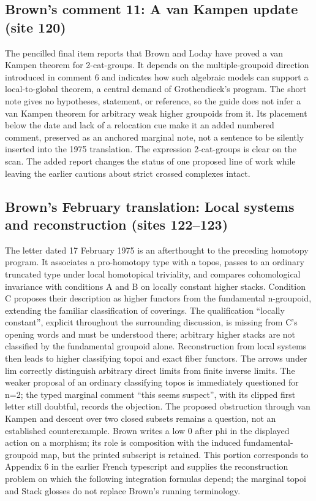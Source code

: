 \subsection*{Brown's comment 11: A van Kampen update (site 120)}
The pencilled final item reports that Brown and Loday have proved a van Kampen theorem for 2-cat-groups. It depends on the multiple-groupoid direction introduced in comment 6 and indicates how such algebraic models can support a local-to-global theorem, a central demand of Grothendieck's program. The short note gives no hypotheses, statement, or reference, so the guide does not infer a van Kampen theorem for arbitrary weak higher groupoids from it. Its placement below the date and lack of a relocation cue make it an added numbered comment, preserved as an anchored marginal note, not a sentence to be silently inserted into the 1975 translation. The expression 2-cat-groups is clear on the scan. The added report changes the status of one proposed line of work while leaving the earlier cautions about strict crossed complexes intact.

\subsection*{Brown's February translation: Local systems and reconstruction (sites 122--123)}
The letter dated 17 February 1975 is an afterthought to the preceding homotopy program. It associates a pro-homotopy type with a topos, passes to an ordinary truncated type under local homotopical triviality, and compares cohomological invariance with conditions A and B on locally constant higher stacks. Condition C proposes their description as higher functors from the fundamental n-groupoid, extending the familiar classification of coverings. The qualification ``locally constant'', explicit throughout the surrounding discussion, is missing from C's opening words and must be understood there; arbitrary higher stacks are not classified by the fundamental groupoid alone. Reconstruction from local systems then leads to higher classifying topoi and exact fiber functors. The arrows under lim correctly distinguish arbitrary direct limits from finite inverse limits. The weaker proposal of an ordinary classifying topos is immediately questioned for n=2; the typed marginal comment ``this seems suspect'', with its clipped first letter still doubtful, records the objection. The proposed obstruction through van Kampen and descent over two closed subsets remains a question, not an established counterexample. Brown writes a low 0 after phi in the displayed action on a morphism; its role is composition with the induced fundamental-groupoid map, but the printed subscript is retained. This portion corresponds to Appendix 6 in the earlier French typescript and supplies the reconstruction problem on which the following integration formulas depend; the marginal topoi and Stack glosses do not replace Brown's running terminology.

